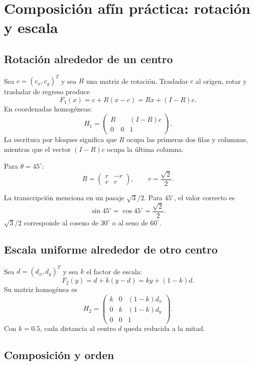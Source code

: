 \section{Composición afín práctica: rotación y escala}\label{cap:16}\label{ap:composicion-afin}

\subsection{Rotación alrededor de un centro}

Sea \(c=(c_x,c_y)^T\) y sea \(R\) una matriz de rotación. Trasladar \(c\) al origen, rotar
y trasladar de regreso produce
\[
F_1(x)=c+R(x-c)=Rx+(I-R)c.
\]
En coordenadas homogéneas:
\[
\boxed{
H_1=
\left(
\begin{array}{c|c}
R&(I-R)c\\ \hline
0\quad0&1
\end{array}
\right)
}.
\]
La escritura por bloques significa que \(R\) ocupa las primeras dos filas y columnas, mientras
que el vector \((I-R)c\) ocupa la última columna.

Para \(\theta=45^\circ\):
\[
R=
\begin{pmatrix}
r&-r\\
r&r
\end{pmatrix},
\qquad
r=\frac{\sqrt2}{2}.
\]

\begin{atencion}
La transcripción menciona en un pasaje \(\sqrt3/2\). Para \(45^\circ\), el valor correcto es
\[
\sin45^\circ=\cos45^\circ=\frac{\sqrt2}{2}.
\]
\(\sqrt3/2\) corresponde al coseno de \(30^\circ\) o al seno de \(60^\circ\).
\end{atencion}

\subsection{Escala uniforme alrededor de otro centro}

Sea \(d=(d_x,d_y)^T\) y sea \(k\) el factor de escala:
\[
F_2(y)=d+k(y-d)=ky+(1-k)d.
\]
Su matriz homogénea es
\[
\boxed{
H_2=
\begin{pmatrix}
k&0&(1-k)d_x\\
0&k&(1-k)d_y\\
0&0&1
\end{pmatrix}
}.
\]
Con \(k=0.5\), cada distancia al centro \(d\) queda reducida a la mitad.

\subsection{Composición y orden}

